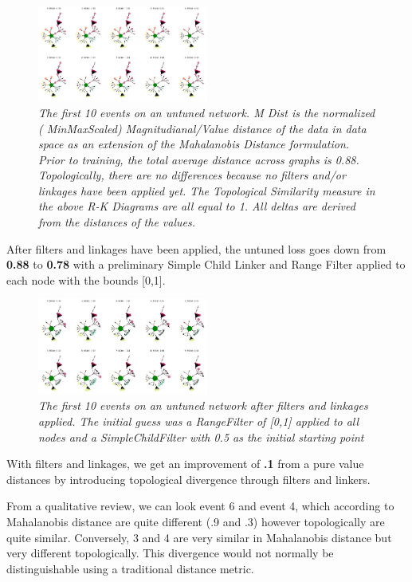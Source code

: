 \begin{figure}[H]
	\centering
        \includegraphics[width=0.5\textwidth]{images/store_sales_before_pipe_10.png}
	\caption{\textit{The first 10 events on an untuned network. M Dist is the normalized ( MinMaxScaled) Magnitudianal/Value distance of the data in data space as an extension of the Mahalanobis Distance formulation. Prior to training, the total average distance across graphs is 0.88. Topologically, there are no differences because no filters and/or linkages have been applied yet. The Topological Similarity measure in the above R-K Diagrams are all equal to 1. All deltas are derived from the distances of the values.}}
	\label{fig:store_sales_before_pipe}
\end{figure}

After filters and linkages have been applied, the untuned loss goes down from \textbf{0.88} to \textbf{0.78} with a preliminary Simple Child Linker and Range Filter applied to each node with the bounds [0,1].

\begin{figure}[H]
	\centering
        \includegraphics[width=0.5\textwidth]{images/store_sales_untuned_10.png}
	\caption{\textit{The first 10 events on an untuned network after filters and linkages applied. The initial guess was a RangeFilter of [0,1] applied to all nodes and a SimpleChildFilter with 0.5 as the initial starting point}}
	\label{fig:untuned_10}
\end{figure}


With filters and linkages, we get an improvement of \textbf{.1} from a pure value distances by introducing topological divergence through filters and linkers.

From a qualitative review, we can look event 6 and event 4, which according to Mahalanobis distance are quite different (.9 and .3) however topologically are quite similar. Conversely, 3 and 4 are very similar in Mahalanobis distance but very different topologically. This divergence would not normally be distinguishable using a traditional distance metric.

